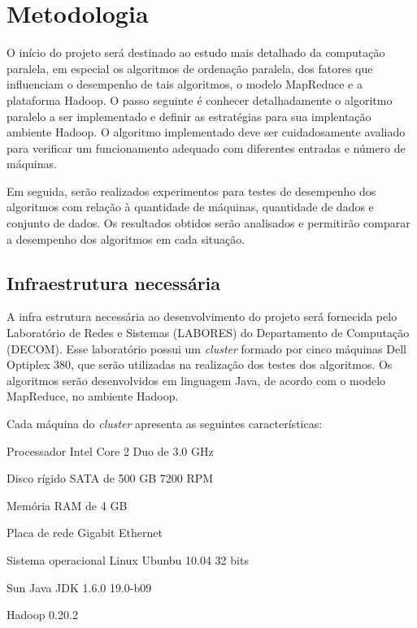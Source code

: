 \chapter{Metodologia}
\label{cap:metodologia}


O início do projeto será destinado ao estudo mais detalhado da computação paralela, em especial os algoritmos de ordenação paralela, dos fatores que influenciam o desempenho de tais algoritmos, o modelo MapReduce e a plataforma Hadoop. O passo seguinte é conhecer detalhadamente o algoritmo paralelo a ser implementado e definir as estratégias para sua implentação ambiente Hadoop. 
O algoritmo implementado deve ser cuidadosamente avaliado para verificar um funcionamento adequado com diferentes entradas e número de máquinas. 

Em seguida, serão realizados experimentos para testes de desempenho dos algoritmos com relação à quantidade de máquinas, quantidade de dados e conjunto de dados.  Os resultados obtidos serão analisados e permitirão comparar a desempenho dos algoritmos em cada situação. 


\section{Infraestrutura necessária}

A infra estrutura necessária ao desenvolvimento do projeto será fornecida pelo Laboratório de Redes e Sistemas (LABORES) do Departamento de Computação (DECOM). Esse laboratório possui um \textit{cluster} formado por cinco máquinas Dell Optiplex 380, que serão utilizadas na realização dos testes dos algoritmos. Os algoritmos serão desenvolvidos em linguagem Java, de acordo com o modelo MapReduce, no ambiente Hadoop. 

Cada máquina do \textit{cluster} apresenta as seguintes características:
\begin{packed_enum}
\item Processador Intel Core 2 Duo de 3.0 GHz
\item Disco rígido SATA de 500 GB 7200 RPM
\item Memória RAM de 4 GB
\item Placa de rede Gigabit Ethernet
\item Sistema operacional Linux Ubunbu 10.04 32 bits %
\item Sun Java JDK 1.6.0 19.0-b09 
\item Hadoop 0.20.2
\end{packed_enum}


